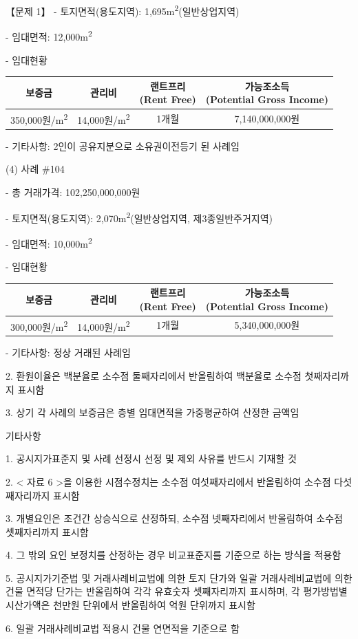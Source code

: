 \begin{longquestion}{【문제 1】}
- 토지면적(용도지역): 1,695m\textsuperscript{2}(일반상업지역) \par
- 임대면적: 12,000m\textsuperscript{2} \par
- 임대현황 \par
{\small\centering
\begin{tabular}{|c|c|c|c|}\hline
보증금 & 관리비 & \makecell{랜트프리\\(Rent Free)} & \makecell{가능조소득\\(Potential Gross Income)} \\\hline
350,000원/m\textsuperscript{2} & 14,000원/m\textsuperscript{2} & 1개월 & 7,140,000,000원 \\\hline
\end{tabular}\par}
- 기타사항: 2인이 공유지분으로 소유권이전등기 된 사례임 \par
(4) 사례 \#104 \par
- 총 거래가격: 102,250,000,000원 \par
- 토지면적(용도지역): 2,070m\textsuperscript{2}(일반상업지역, 제3종일반주거지역) \par
- 임대면적: 10,000m\textsuperscript{2} \par
- 임대현황 \par
{\small\centering
\begin{tabular}{|c|c|c|c|}\hline
보증금 & 관리비 & \makecell{랜트프리\\(Rent Free)} & \makecell{가능조소득\\(Potential Gross Income)} \\\hline
300,000원/m\textsuperscript{2} & 14,000원/m\textsuperscript{2} & 1개월 & 5,340,000,000원 \\\hline
\end{tabular}\par}
- 기타사항: 정상 거래된 사례임 \par
2. 환원이율은 백분율로 소수점 둘째자리에서 반올림하여 백분율로 소수점 첫째자리까지 표시함 \par
3. 상기 각 사례의 보증금은 층별 임대면적을 가중평균하여 산정한 금액임 \par
\medskip{} 기타사항 \par
1. 공시지가표준지 및 사례 선정시 선정 및 제외 사유를 반드시 기재할 것 \par
2. < 자료 6 >을 이용한 시점수정치는 소수점 여섯째자리에서 반올림하여 소수점 다섯째자리까지 표시함 \par
3. 개별요인은 조건간 상승식으로 산정하되, 소수점 넷째자리에서 반올림하여 소수점 셋째자리까지 표시함 \par
4. 그 밖의 요인 보정치를 산정하는 경우 비교표준지를 기준으로 하는 방식을 적용함 \par
5. 공시지가기준법 및 거래사례비교법에 의한 토지 단가와 일괄 거래사례비교법에 의한 건물 면적당 단가는 반올림하여 각각 유효숫자 셋째자리까지 표시하며, 각 평가방법별 시산가액은 천만원 단위에서 반올림하여 억원 단위까지 표시함 \par
6. 일괄 거래사례비교법 적용시 건물 연면적을 기준으로 함 \par
\end{longquestion}
